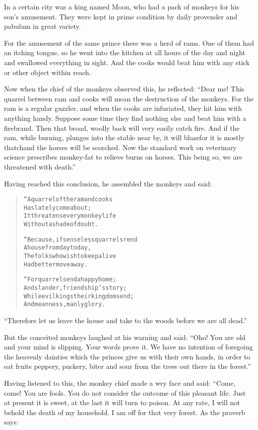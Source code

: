 \documentclass[article, twoside, 14pt]{memoir}
\renewenvironment{verbatim}{%
\begin{quote}%
\vskip -10pt%
\begin{alltt}\normalfont\large}{\end{alltt}%
\end{quote}%
\vskip -10pt
} %
\begin{document}
\label{s87}

In a certain city was a king named Moon, who had a pack of monkeys
for his son's amusement. They were kept in prime condition by daily
provender and pabulum in great variety.

For the amusement of the same prince there was a herd of rams. One
of them had an itching tongue, so he went into the kitchen at all
hours of the day and night and swallowed everything in sight. And
the cooks would beat him with any stick or other object within
reach.

Now when the chief of the monkeys observed this, he reflected:
``Dear me! This quarrel between ram and cooks will mean the destruction of the monkeys. For the ram is a regular guzzler, and when the cooks are infuriated, they hit him with anything handy. Suppose some time they find nothing else and beat him with a firebrand. Then that broad, woolly back will very easily catch fire. And if the ram, while burning, plunges into the stable near by, it will blaze{\textemdash}for it is mostly thatch{\textemdash}and the horses will be scorched. Now the standard work on veterinary science prescribes monkey-fat to relieve burns on horses. This being so, we are threatened with death.''

Having reached this conclusion, he assembled the monkeys and said:


\begin{verbatim}
“A quarrel of the ram and cooks
    Has lately come about;
It threatens every monkey life
    Without a shade of doubt.

“Because, if senseless quarrels rend
    A house from day to day,
The folks who wish to keep alive
    Had better move away.

“For quarrels end a happy home;
    And slander, friendship's story;
While evil kings their kingdoms end;
    And meanness, manly glory.
\end{verbatim}
``Therefore let us leave the house and take to the woods before we are all dead.''

But the conceited monkeys laughed at his warning and said:
``Oho! You are old and your mind is slipping. Your words prove it. We have no intention of foregoing the heavenly dainties which the princes give us with their own hands, in order to eat fruits peppery, puckery, biter and sour from the trees out there in the forest.''

Having listened to this, the monkey chief made a wry face and said:
“Come, come! You are fools. You do not consider the outcome of this
pleasant life. Just at present it is sweet, at the last it will
turn to poison. At any rate, I will not behold the death of my
household. I am off for that very forest. As the proverb says:
\end{document}
